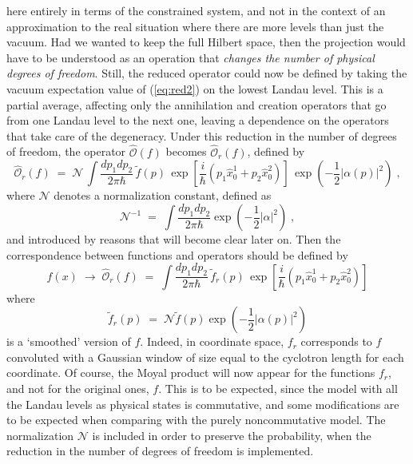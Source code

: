 \documentclass[a4paper,12pt]{article}
\begin{document}
here
entirely in terms of the constrained system, and not in the context
of
an approximation to the real situation where there are more levels
than just the vacuum. Had we wanted to keep the full Hilbert space,
then the projection would have to be understood as an operation
that
{\em changes the number of physical degrees of freedom}.  Still,
the
reduced operator could now be defined by taking the vacuum
expectation
value of (\ref{eq:red2}) on the lowest Landau level. This is a
partial
average, affecting only the annihilation and creation operators
that
go from one Landau level to the next one, leaving a dependence on
the
operators that take care of the degeneracy. Under this reduction in
the number of degrees of freedom, the operator ${\hat {\mathcal
    O}}(f)$ becomes ${\hat {\mathcal O}}_r(f)$, defined by
\begin{equation}
  \label{eq:red4}
  {\hat {\mathcal O}}_r(f)\;=\; {\mathcal N}\, \int \frac{dp_1
dp_2}{2\pi \hbar}\,
  {\tilde f}(p) \, \exp [ \frac{i}{\hbar} (p_1 {\hat x}^1_0 + p_2
{\hat x}^2_0)]
  \, \exp (-\frac{1}{2} |\alpha (p)|^2 ) \;,
\end{equation}
where ${\mathcal N}$ denotes a normalization constant, defined as
\begin{equation}
  \label{eq:defcaln}
{\mathcal N}^{-1} \;=\; \int \frac{dp_1 dp_2}{2\pi \hbar} \exp
(-\frac{1}{2} |\alpha|^2 )
\;,
\end{equation}
and introduced by reasons that will become clear later on.  Then
the
correspondence between functions and operators should be defined by
\begin{equation}
  \label{eq:red5}
  f(x) \;\to \; {\hat {\mathcal O}}_r(f)\;=\; \int \frac{dp_1
dp_2}{2\pi \hbar}\,
    {\tilde f}_r(p) \, \exp [ \frac{i}{\hbar} (p_1 {\hat x}^1_0 +
p_2 
{\hat x}^2_0)]
\end{equation}
where
\begin{equation}
  \label{eq:deff0}
{\tilde f}_r(p) \;=\; {\mathcal N} {\tilde f}(p) \exp (-\frac{1}{2}
|\alpha (p)|^2 ) 
\end{equation}
is a `smoothed' version of $f$. Indeed, in coordinate space, $f_r$
corresponds to $f$ convoluted with a Gaussian window of size equal
to
the cyclotron length for each coordinate. Of course, the Moyal
product
will now appear for the functions $f_r$, and not for the original
ones, $f$. This is to be expected, since the model with all the
Landau
levels as physical states is commutative, and some modifications
are
to be expected when comparing with the purely noncommutative model.
The normalization ${\mathcal N}$ is included in order to preserve
the
probability, when the reduction in the number of degrees of freedom
is
implemented.
\end{document}

